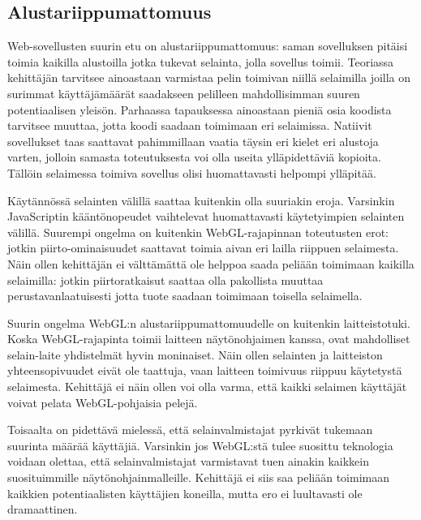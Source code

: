 \subsection{Alustariippumattomuus}
\label{sec_platforms}

Web-sovellusten suurin etu on alustariippumattomuus: saman sovelluksen pitäisi toimia kaikilla alustoilla jotka tukevat selainta, jolla sovellus toimii. Teoriassa kehittäjän tarvitsee ainoastaan varmistaa pelin toimivan niillä selaimilla joilla on surimmat käyttäjämäärät saadakseen pelilleen mahdollisimman suuren potentiaalisen yleisön. Parhaassa tapauksessa ainoastaan pieniä osia koodista tarvitsee muuttaa, jotta koodi saadaan toimimaan eri selaimissa. Natiivit sovellukset taas saattavat pahimmillaan vaatia täysin eri kielet eri alustoja varten, jolloin samasta toteutuksesta voi olla useita ylläpidettäviä kopioita. Tällöin selaimessa toimiva sovellus olisi huomattavasti helpompi ylläpitää.

Käytännössä selainten välillä saattaa kuitenkin olla suuriakin eroja. Varsinkin JavaScriptin kääntönopeudet vaihtelevat huomattavasti käytetyimpien selainten välillä\cite{hoetzlein}. Suurempi ongelma on kuitenkin WebGL-rajapinnan toteutusten erot: jotkin piirto-ominaisuudet saattavat toimia aivan eri lailla riippuen selaimesta\cite{voutilainen}. Näin ollen kehittäjän ei välttämättä ole helppoa saada peliään toimimaan kaikilla selaimilla: jotkin piirtoratkaisut saattaa olla pakollista muuttaa perustavanlaatuisesti jotta tuote saadaan toimimaan toisella selaimella.

Suurin ongelma WebGL:n alustariippumattomuudelle on kuitenkin laitteistotuki. Koska WebGL-rajapinta toimii laitteen näytönohjaimen kanssa, ovat mahdolliset selain-laite yhdistelmät hyvin moninaiset. Näin ollen selainten ja laitteiston yhteensopivuudet eivät ole taattuja, vaan laitteen toimivuus riippuu käytetystä selaimesta\cite{mozillaBlacklist}\cite{webgl_supported}. Kehittäjä ei näin ollen voi olla varma, että kaikki selaimen käyttäjät voivat pelata WebGL-pohjaisia pelejä.

Toisaalta on pidettävä mielessä, että selainvalmistajat pyrkivät tukemaan suurinta määrää käyttäjiä. Varsinkin jos WebGL:stä tulee suosittu teknologia voidaan olettaa, että selainvalmistajat varmistavat tuen ainakin kaikkein suosituimmille näytönohjainmalleille. Kehittäjä ei siis saa peliään toimimaan kaikkien potentiaalisten käyttäjien koneilla, mutta ero ei luultavasti ole dramaattinen.
